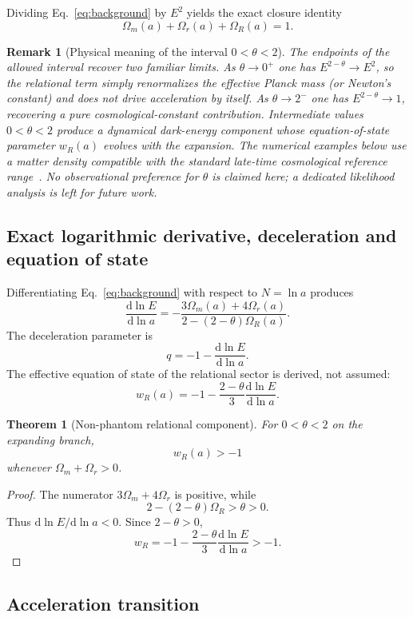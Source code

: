 \documentclass[11pt,a4paper]{article}
\newtheorem{theorem}[axiom]{Theorem}
\newtheorem{remark}[axiom]{Remark}
\renewcommand{\dd}{\mathrm{d}}
\newcommand{\Boxed}[1]{\boxed{\displaystyle #1}}
\begin{document}
Dividing Eq.~\eqref{eq:background} by \(E^2\) yields the exact closure identity
\[
\Omega_m(a)+\Omega_r(a)+\Omega_R(a)=1.
\]

\begin{remark}[Physical meaning of the interval \(0<\theta<2\)]
The endpoints of the allowed interval recover two familiar limits. As \(\theta\to0^+\) one has \(E^{2-\theta}\to E^2\), so the relational term simply renormalizes the effective Planck mass (or Newton's constant) and does not drive acceleration by itself. As \(\theta\to2^-\) one has \(E^{2-\theta}\to1\), recovering a pure cosmological-constant contribution. Intermediate values \(0<\theta<2\) produce a dynamical dark-energy component whose equation-of-state parameter \(w_R(a)\) evolves with the expansion. The numerical examples below use a matter density compatible with the standard late-time cosmological reference range~\cite{Planck}. No observational preference for \(\theta\) is claimed here; a dedicated likelihood analysis is left for future work.
\end{remark}

\subsection{Exact logarithmic derivative, deceleration and equation of state}

Differentiating Eq.~\eqref{eq:background} with respect to \(N=\ln a\) produces
\begin{equation}
\frac{\dd\ln E}{\dd\ln a}=-\frac{3\Omega_m(a)+4\Omega_r(a)}{2-(2-\theta)\Omega_R(a)}.
\end{equation}
The deceleration parameter is
\[
q=-1-\frac{\dd\ln E}{\dd\ln a}.
\]
The effective equation of state of the relational sector is derived, not assumed:
\begin{equation}
\Boxed{w_R(a)=-1-\frac{2-\theta}{3}\frac{\dd\ln E}{\dd\ln a}.}
\end{equation}
\begin{theorem}[Non-phantom relational component]
For \(0<\theta<2\) on the expanding branch,
\[
w_R(a)>-1
\]
whenever \(\Omega_m+\Omega_r>0\).
\end{theorem}
\begin{proof}
The numerator \(3\Omega_m+4\Omega_r\) is positive, while
\[
2-(2-\theta)\Omega_R>\theta>0.
\]
Thus \(\dd\ln E/\dd\ln a<0\). Since \(2-\theta>0\),
\[
w_R
=
-1-\frac{2-\theta}{3}\frac{\dd\ln E}{\dd\ln a}
>-1.
\]
\end{proof}

\subsection{Acceleration transition}
\end{document}
